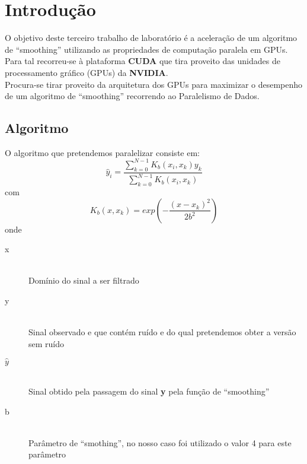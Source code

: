 \chapter{Introdução}
O objetivo deste terceiro trabalho de laboratório é a aceleração de um algoritmo de ``smoothing'' utilizando as propriedades de computação paralela em GPUs.\\

Para tal recorreu-se à plataforma \textbf{CUDA} que tira proveito das unidades de processamento gráfico (GPUs) da \textbf{NVIDIA}.\\

Procura-se tirar proveito da arquitetura dos GPUs para maximizar o desempenho de um algoritmo de ``smoothing'' recorrendo ao Paralelismo de Dados.\\

\section{Algoritmo}
O algoritmo que pretendemos paralelizar consiste em:
\[ \hat{y}_i=\frac{\sum_{k=0}^{N-1} K_{b}(x_i,x_k)y_k}{\sum_{k=0}^{N-1} K_{b}(x_i,x_k)} \]
com
\[ K_b(x,x_k)=exp\left ( -\frac{\left ( x-x_k \right )^2}{2b^2} \right ) \]
onde
\begin{description}
	\item[x] \hfill \\
	Domínio do sinal a ser filtrado
	\item[y] \hfill \\
	Sinal observado e que contém ruído e do qual pretendemos obter a versão sem ruído
	\item[$\hat{y}$] \hfill \\
	Sinal obtido pela passagem do sinal \textbf{y} pela função de ``smoothing''
	\item[b] \hfill \\
	Parâmetro de ``smothing'', no nosso caso foi utilizado o valor 4 para este parâmetro
\end{description}